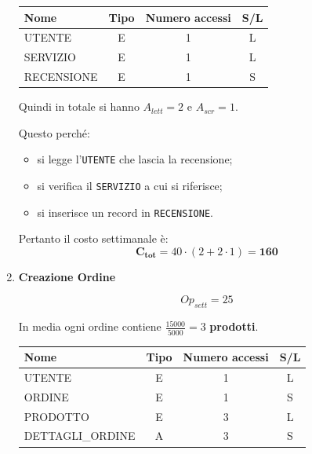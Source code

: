 \documentclass[a4paper,12pt]{report}
\begin{document}
\begin{enumerate}
	      \begin{table}[H]
		      \centering
		      \small
		      \renewcommand{\arraystretch}{1.15}
		      \begin{tabularx}{0.8\textwidth}{|X|c|c|c|}
			      \hline
			      \rowcolor{gray!20}
			      \textbf{Nome} & \textbf{Tipo} & \textbf{Numero accessi} & \textbf{S/L} \\
			      \hline
			      UTENTE        & E             & 1                       & L            \\
			      SERVIZIO      & E             & 1                       & L            \\
			      RECENSIONE    & E             & 1                       & S            \\
			      \hline
		      \end{tabularx}
	      \end{table}

	      Quindi in totale si hanno $A_{lett}=2$ e $A_{scr}=1$.

	      Questo perché:
	      \begin{itemize}
		      \item si legge l'\texttt{UTENTE} che lascia la recensione;
		      \item si verifica il \texttt{SERVIZIO} a cui si riferisce;
		      \item si inserisce un record in \texttt{RECENSIONE}.
	      \end{itemize}

	      Pertanto il costo settimanale è:
	      $$\mathbf{C_{tot}} = 40 \cdot (2 + 2 \cdot 1) = \mathbf{160}$$

	\item {\large \textbf{Creazione Ordine}} \label{op4}

	      $$
		      {Op}_{sett} = 25
	      $$

	      In media ogni ordine contiene $\frac{15000}{5000}=3$ \textbf{prodotti}.

	      \begin{table}[H]
		      \centering
		      \small
		      \renewcommand{\arraystretch}{1.15}
		      \begin{tabularx}{0.9\textwidth}{|X|c|c|c|}
			      \hline
			      \rowcolor{gray!20}
			      \textbf{Nome}    & \textbf{Tipo} & \textbf{Numero accessi} & \textbf{S/L} \\
			      \hline
			      UTENTE           & E             & 1                       & L            \\
			      ORDINE           & E             & 1                       & S            \\
			      PRODOTTO         & E             & 3                       & L            \\
			      DETTAGLI\_ORDINE & A             & 3                       & S            \\
			      \hline
		      \end{tabularx}
	      \end{table}


\end{enumerate}
\end{document}
